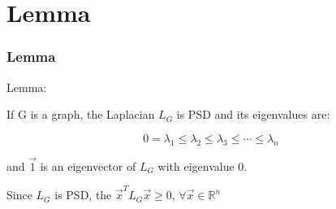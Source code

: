 \documentclass{beamer}
\begin{document}

\section{Lemma}
\begin{frame}
\frametitle{\textbf{Lemma} }
Lemma: \vspace{0.2 cm}

If G is a graph, the Laplacian $L_{G}$ is PSD and its eigenvalues are:

\begin{equation*}
    0 = \lambda_{1} \leq \lambda_{2} \leq \lambda_{3} \leq \cdots \leq \lambda_{n}
\end{equation*}

and $\vec{1}$ is an eigenvector of $L_{G}$ with eigenvalue 0.

Since $L_{G}$ is PSD, the $\vec{x}^{T}L_{G}\vec{x} \geq 0$, $\forall \vec{x} \in \mathbb{R}^n$

\end{frame}

\end{document}
